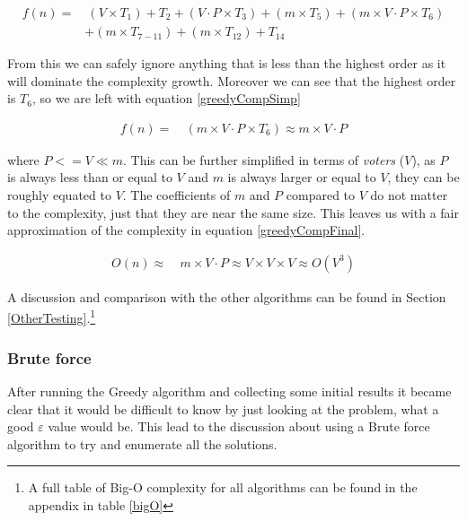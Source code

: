 \documentclass[12pt]{report}
\begin{document}
\begin{equation}\label{greedyComp}
\begin{aligned}
	f(n) ={} & \ (V \times T_1) + T_2 + (V \cdot P \times T_3) + (m \times T_5) + (m \times V \cdot P \times T_6) \\
	 	& + (m \times T_{7 - 11}) + (m \times T_{12}) + T_{14}
\end{aligned}
\end{equation}

From this we can safely ignore anything that is less than the highest order as it will dominate the complexity growth. Moreover we can see that the highest order is $T_6$, so we are left with equation \ref{greedyCompSimp}

\begin{equation}\label{greedyCompSimp}
\begin{aligned}
	f(n) ={} & \ (m \times V \cdot P \times T_6) \approx m \times V \cdot P
\end{aligned}
\end{equation}

where $P <= V \ll m$. This can be further simplified in terms of \textit{voters} ($V$), as $P$ is always less than or equal to $V$ and $m$ is always larger or equal to $V$, they can be roughly equated to $V$. The coefficients of $m$ and $P$ compared to $V$ do not matter to the complexity, just that they are near the same size. This leaves us with a fair approximation of the complexity in equation \ref{greedyCompFinal}.

\begin{equation}\label{greedyCompFinal}
\begin{aligned}
	O(n) \approx{} & \ m \times V \cdot P \approx V \times V \times V \approx O(V^3)
\end{aligned}
\end{equation}

A discussion and comparison with the other algorithms can be found in Section \ref{OtherTesting}.\footnote{A full table of Big-O complexity for all algorithms can be found in the appendix in table \ref{bigO}}

\subsubsection{Brute force}
After running the Greedy algorithm and collecting some initial results it became clear that it would be difficult to know by just looking at the problem, what a good $\varepsilon$ value would be. This lead to the discussion about using a Brute force algorithm to try and enumerate all the solutions.
\end{document}

